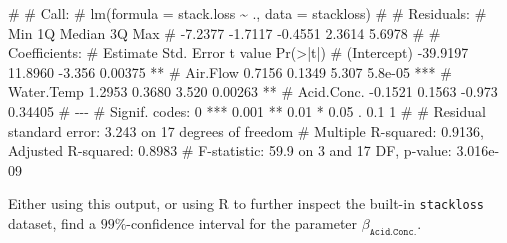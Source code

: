 \documentclass[
  a4paper,
]{article}
\newenvironment{Shaded}{\begin{snugshade}}{\end{snugshade}}
\newcommand{\NormalTok}[1]{#1}
\theoremstyle{definition}
\theoremstyle{definition}
\theoremstyle{definition}
\theoremstyle{definition}
\theoremstyle{remark}
\begin{document}
\begin{Shaded}
\begin{Highlighting}[]
\NormalTok{\# }
\NormalTok{\# Call:}
\NormalTok{\# lm(formula = stack.loss \textasciitilde{} ., data = stackloss)}
\NormalTok{\# }
\NormalTok{\# Residuals:}
\NormalTok{\#     Min      1Q  Median      3Q     Max }
\NormalTok{\# {-}7.2377 {-}1.7117 {-}0.4551  2.3614  5.6978 }
\NormalTok{\# }
\NormalTok{\# Coefficients:}
\NormalTok{\#             Estimate Std. Error t value Pr(\textgreater{}|t|)    }
\NormalTok{\# (Intercept) {-}39.9197    11.8960  {-}3.356  0.00375 ** }
\NormalTok{\# Air.Flow      0.7156     0.1349   5.307  5.8e{-}05 ***}
\NormalTok{\# Water.Temp    1.2953     0.3680   3.520  0.00263 ** }
\NormalTok{\# Acid.Conc.   {-}0.1521     0.1563  {-}0.973  0.34405    }
\NormalTok{\# {-}{-}{-}}
\NormalTok{\# Signif. codes:  0 \textquotesingle{}***\textquotesingle{} 0.001 \textquotesingle{}**\textquotesingle{} 0.01 \textquotesingle{}*\textquotesingle{} 0.05 \textquotesingle{}.\textquotesingle{} 0.1 \textquotesingle{} \textquotesingle{} 1}
\NormalTok{\# }
\NormalTok{\# Residual standard error: 3.243 on 17 degrees of freedom}
\NormalTok{\# Multiple R{-}squared:  0.9136,  Adjusted R{-}squared:  0.8983 }
\NormalTok{\# F{-}statistic:  59.9 on 3 and 17 DF,  p{-}value: 3.016e{-}09}
\end{Highlighting}
\end{Shaded}

Either using this output, or using R to further inspect the built-in
\texttt{stackloss} dataset, find a \(99\%\)-confidence interval for the
parameter \(\beta_\mathtt{Acid.Conc.}\).
\end{document}
